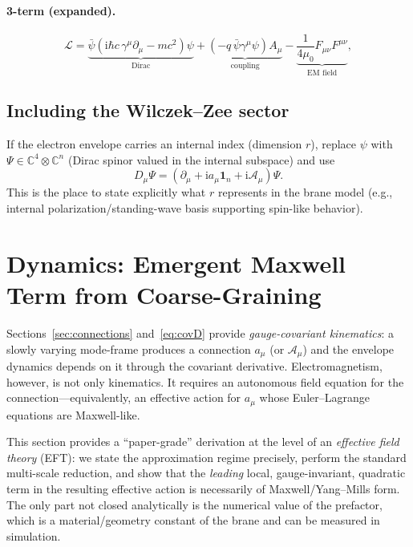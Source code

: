 \documentclass[11pt,a4paper]{article}
\newcommand{\C}{\mathbb{C}}
\providecommand{\ii}{\mathrm{i}}
\newcommand{\Lag}{\mathcal{L}}              %
\newcommand{\bbA}{\mathcal{A}}              %
\newcommand{\covD}{D}                       %
\newcommand{\psibar}{\bar{\psi}}
\newcommand{\gamm}{\gamma}
\begin{document}
\paragraph{3-term (expanded).}
\begin{equation}
\Lag
=
\underbrace{\psibar(\ii\hbar c\,\gamm^\mu \partial_\mu - mc^2)\psi}_{\text{Dirac}}
+
\underbrace{(-q\,\psibar\gamm^\mu\psi)A_\mu}_{\text{coupling}}
-
\underbrace{\frac{1}{4\mu_0}F_{\mu\nu}F^{\mu\nu}}_{\text{EM field}},
\label{eq:Lag_expanded}
\end{equation}

\subsection{Including the Wilczek--Zee sector}
If the electron envelope carries an internal index (dimension \(r\)), replace \(\psi\) with
\(\Psi\in\C^{4}\otimes\C^{n}\) (Dirac spinor valued in the internal subspace) and use
\[
\covD_\mu \Psi = \left(\partial_\mu + \ii a_\mu \mathbf{1}_n + \ii\bbA_\mu\right)\Psi.
\]
This is the place to state explicitly what \(r\) represents in the brane model
(e.g., internal polarization/standing-wave basis supporting spin-like behavior).


\section{Dynamics: Emergent Maxwell Term from Coarse-Graining}
\label{sec:maxwell_term}

Sections~\ref{sec:connections} and~\eqref{eq:covD} provide \emph{gauge-covariant kinematics}:
a slowly varying mode-frame produces a connection \(a_\mu\) (or \(\bbA_\mu\)) and
the envelope dynamics depends on it through the covariant derivative.
Electromagnetism, however, is not only kinematics. It requires an autonomous field equation
for the connection---equivalently, an effective action for \(a_\mu\) whose Euler--Lagrange
equations are Maxwell-like.

This section provides a ``paper-grade'' derivation at the level of an \emph{effective field theory}
(EFT): we state the approximation regime precisely, perform the standard multi-scale reduction,
and show that the \emph{leading} local, gauge-invariant, quadratic term in the resulting effective
action is necessarily of Maxwell/Yang--Mills form. The only part not closed analytically is the
numerical value of the prefactor, which is a material/geometry constant of the brane and can be
measured in simulation.
\end{document}

